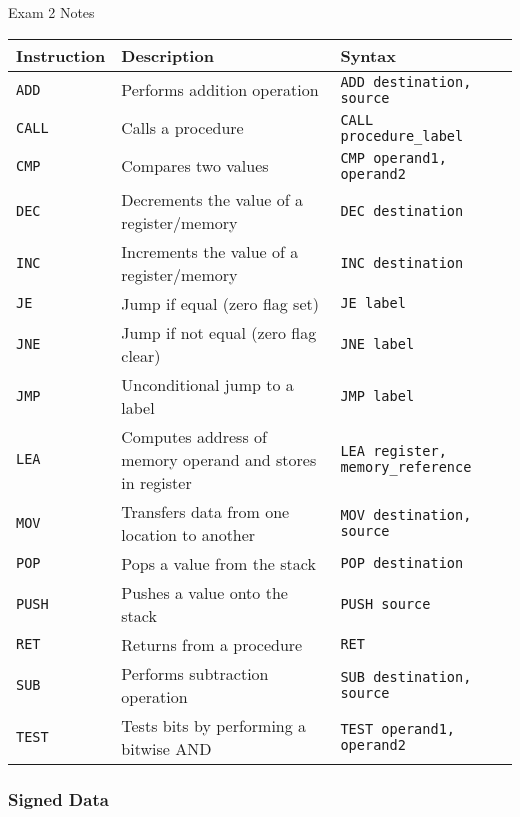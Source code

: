 \begin{examnotes}{Exam 2 Notes}
    \begin{center}
        \begin{tabular}{|l|l|l|}
            \hline \textbf{Instruction} & \textbf{Description} & \textbf{Syntax} \\ \hline
            \texttt{ADD} & Performs addition operation & \texttt{ADD destination, source} \\ \hline
            \texttt{CALL} & Calls a procedure & \texttt{CALL procedure\_label} \\ \hline
            \texttt{CMP} & Compares two values & \texttt{CMP operand1, operand2} \\ \hline
            \texttt{DEC} & Decrements the value of a register/memory & \texttt{DEC destination} \\ \hline
            \texttt{INC} & Increments the value of a register/memory & \texttt{INC destination} \\ \hline
            \texttt{JE} & Jump if equal (zero flag set) & \texttt{JE label} \\ \hline
            \texttt{JNE} & Jump if not equal (zero flag clear) & \texttt{JNE label} \\ \hline
            \texttt{JMP} & Unconditional jump to a label & \texttt{JMP label} \\ \hline
            \texttt{LEA} & Computes address of memory operand and stores in register & \texttt{LEA register, memory\_reference} \\ \hline
            \texttt{MOV} & Transfers data from one location to another & \texttt{MOV destination, source} \\ \hline
            \texttt{POP} & Pops a value from the stack & \texttt{POP destination} \\ \hline
            \texttt{PUSH} & Pushes a value onto the stack & \texttt{PUSH source} \\ \hline
            \texttt{RET} & Returns from a procedure & \texttt{RET} \\ \hline
            \texttt{SUB} & Performs subtraction operation & \texttt{SUB destination, source} \\ \hline
            \texttt{TEST} & Tests bits by performing a bitwise AND & \texttt{TEST operand1, operand2} \\ \hline
        \end{tabular}
    \end{center}

    \subsubsection*{Signed Data}


\end{examnotes}
